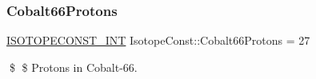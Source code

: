 \subsubsection{\texorpdfstring{Cobalt66\+Protons}{Cobalt66Protons}}
{\footnotesize\ttfamily \mbox{\hyperlink{group___isotope_const-_macros_ga5f18360b3e99483a35c32d789e62621c}{I\+S\+O\+T\+O\+P\+E\+C\+O\+N\+S\+T\+\_\+\+I\+NT}} Isotope\+Const\+::\+Cobalt66\+Protons = 27}

\$ \$ Protons in Cobalt-\/66. 